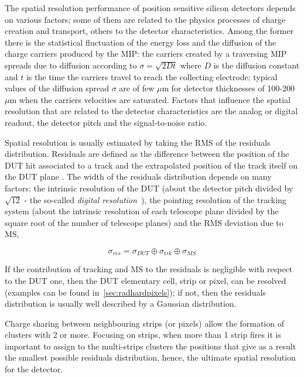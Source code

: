 The spatial resolution performance of position sensitive silicon detectors depends on various factors; 
some of them are related to the physics processes of charge creation and transport, others to 
the detector characteristics. 
Among the former there is the statistical fluctuation 
of the energy loss 
 and the diffusion of the charge carriers produced by the MIP: the carriers created by a traversing MIP 
 spreads  due to diffusion according to $\sigma = \sqrt{2Dt}$ where $D$ is the diffusion constant and 
 $t$ is the time the carriers travel to reach the collecting electrode; typical values of the diffusion 
 spread $\sigma$ are of few $\mu$m for detector thicknesses of 100-200~$\mu$m when the  
  carriers velocities are saturated.
Factors that influence the spatial resolution that are related to the  detector characteristics are the 
analog or digital readout, the detector pitch and the signal-to-noise ratio.

Spatial resolution is usually estimated by taking the RMS of the residuals distribution. Residuals are 
defined as the difference between the position of the DUT hit associated to a track and 
the extrapolated position of the track itself on the DUT plane . 
The width of the residuals distribution depends on many factors: the intrinsic resolution of the 
DUT (about the detector pitch divided by $\sqrt{12}$ - the so-called {\it digital resolution}~\cite{TURCHETTA}), the pointing resolution of the tracking system 
(about the intrinsic resolution of each telescope plane divided by the square root of the number of 
telescope planes) and the RMS deviation due to MS,

\begin{equation}
\sigma_{res}=\sigma_{DUT}\oplus\sigma_{trk}\oplus\sigma_{MS}
\label{eq:res}
\end{equation}

If the contribution of tracking and MS to the residuals is negligible with respect to the DUT 
one, then the DUT elementary cell, strip or pixel, can be resolved (examples can be found 
in~\ref{sec:radhardpixels}); if not, then the residuals distribution 
is usually well described by a Gaussian distribution. 

Charge sharing between neighbouring strips (or pixels) allow the formation of clusters with 2 
or more. Focusing on strips, when more than 1 strip fires it is important to assign to the 
multi-strips clusters the positions that give as a result the smallest possible residuals distribution, 
hence, the ultimate spatial resolution for the detector. 


